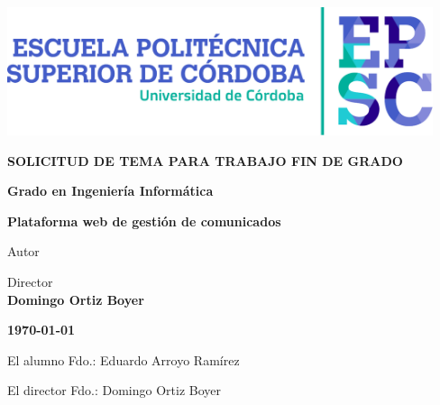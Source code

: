 \documentclass[a4paper,12pt,twoside,final]{article}
\begin{document}
\begin{center}
\fontfamily{\sfdefault}\selectfont
\vspace*{2cm}

\vfill
\vfill
\includegraphics[width=12.5cm]{LogotipoEPSC.pdf}
\vfill
\vfill

\large\textbf{\color{epsc:medio}
  SOLICITUD DE TEMA PARA TRABAJO FIN DE GRADO
}
\vfill

\Large\textbf{\color{epsc:verde}
  Grado en Ingeniería Informática
}
\vfill
\vfill

\Huge\textbf{\color{epsc:oscuro}
  Plataforma web de gestión de comunicados
}
\vfill
\vfill

\large{\color{epsc:oscuro}Autor}\\
\textbf{\color{epsc:medio}{ Eduardo Arroyo Ramírez }}
\vfill

\large{\color{epsc:oscuro} Director }\\
\textbf{\color{epsc:medio} Domingo Ortiz Boyer}
\vfill



\textbf{\color{epsc:verde} \monthyeardate\today}
\vfill
\vfill
\vspace{2.7cm}
\end{center}


\clearpage

\thispagestyle{empty}
\pagecolor{white}

\cleardoublepage

\tableofcontents
\listoftables

\clearpage 


\clearpage

\clearpage

\clearpage

\clearpage



\clearpage


\noindent
\begin{minipage}[c][4cm][c]{.5\textwidth}
  \centering
    El alumno
    \vfill
    Fdo.: Eduardo Arroyo Ramírez
\end{minipage}%
\begin{minipage}[c][4cm][c]{.5\textwidth}
  \centering
    El director
    \vfill
    Fdo.: Domingo Ortiz Boyer
\end{minipage}
\end{document}
